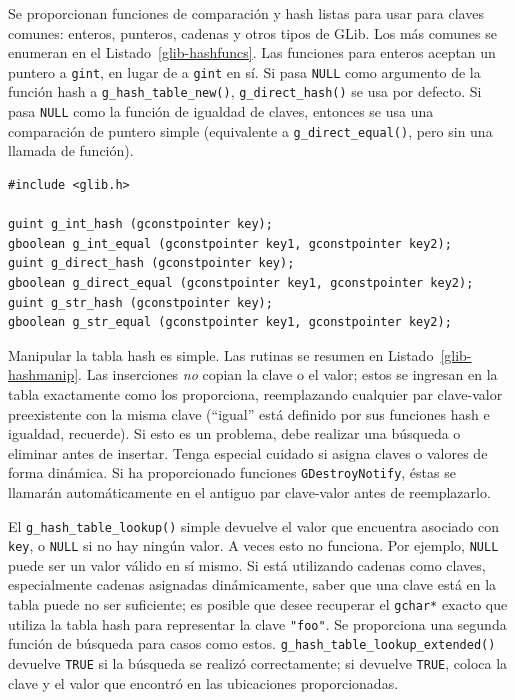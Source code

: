 Se proporcionan funciones de comparación y hash listas para usar para claves comunes: enteros, punteros, cadenas y otros tipos de GLib. Los más comunes se enumeran en el Listado~\ref{glib-hashfuncs}. Las funciones para enteros aceptan un puntero a \lstinline{gint}, en lugar de a \lstinline{gint} en sí. Si pasa \lstinline{NULL} como argumento de la función hash a \lstinline{g_hash_table_new()}, \lstinline{g_direct_hash()} se usa por defecto. Si pasa \lstinline{NULL} como la función de igualdad de claves, entonces se usa una comparación de puntero simple (equivalente a \lstinline{g_direct_equal()}, pero sin una llamada de función).

\begin{lstlisting}[style=GLib/GTK, caption={Hashes/comparaciones preescritos}, label=glib-hashfuncs]
#include <glib.h>

guint g_int_hash (gconstpointer key);
gboolean g_int_equal (gconstpointer key1, gconstpointer key2);
guint g_direct_hash (gconstpointer key);
gboolean g_direct_equal (gconstpointer key1, gconstpointer key2);
guint g_str_hash (gconstpointer key);
gboolean g_str_equal (gconstpointer key1, gconstpointer key2);
\end{lstlisting}

Manipular la tabla hash es simple. Las rutinas se resumen en Listado~\ref{glib-hashmanip}. Las inserciones \emph{no} copian la clave o el valor; estos se ingresan en la tabla exactamente como los proporciona, reemplazando cualquier par clave-valor preexistente con la misma clave (``igual'' está definido por sus funciones hash e igualdad, recuerde). Si esto es un problema, debe realizar una búsqueda o eliminar antes de insertar. Tenga especial cuidado si asigna claves o valores de forma dinámica. Si ha proporcionado funciones \lstinline{GDestroyNotify}, éstas se llamarán automáticamente en el antiguo par clave-valor antes de reemplazarlo.

El \lstinline{g_hash_table_lookup()} simple devuelve el valor que encuentra asociado con \lstinline{key}, o \lstinline{NULL} si no hay ningún valor. A veces esto no funciona. Por ejemplo, \lstinline{NULL} puede ser un valor válido en sí mismo. Si está utilizando cadenas como claves, especialmente cadenas asignadas dinámicamente, saber que una clave está en la tabla puede no ser suficiente; es posible que desee recuperar el \lstinline{gchar*} exacto que utiliza la tabla hash para representar la clave \lstinline{"foo"}. Se proporciona una segunda función de búsqueda para casos como estos. \lstinline{g_hash_table_lookup_extended()} devuelve \lstinline{TRUE} si la búsqueda se realizó correctamente; si devuelve \lstinline{TRUE}, coloca la clave y el valor que encontró en las ubicaciones proporcionadas.

